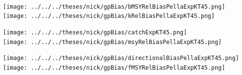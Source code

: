 \documentclass[ xcolor = pdftex, dvipsnames, table ]{beamer}
\begin{document}
{%
\begin{frame}%
$~$
\hspace*{-1.25cm}
\begin{minipage}[h!]{0.33\textwidth}
\hspace*{0.25cm}
\texttt{[image: ../../../theses/nick/gpBias/bMSYRelBiasPellaExpKT45.png]}\\
\hspace*{0.25cm}
\texttt{[image: ../../../theses/nick/gpBias/kRelBiasPellaExpKT45.png]}
\end{minipage}
\begin{minipage}[h!]{0.33\textwidth}
\hspace*{0.75cm}
\texttt{[image: ../../../theses/nick/gpBias/catchExpKT45.png]}\\
\hspace*{0.75cm}
\texttt{[image: ../../../theses/nick/gpBias/msyRelBiasPellaExpKT45.png]}
\end{minipage}
\begin{minipage}[h!]{0.33\textwidth}
\hspace*{1cm}
\texttt{[image: ../../../theses/nick/gpBias/directionalBiasPellaExpKT45.png]}\\
\hspace*{1cm}
\texttt{[image: ../../../theses/nick/gpBias/fMSYRelBiasPellaExpKT45.png]}
\end{minipage}
\end{frame}

}
\end{document}
